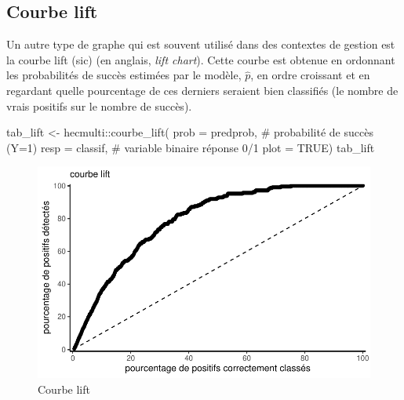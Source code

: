 \documentclass[
  11pt,
  letterpaper,
]{scrbook}
\newenvironment{Shaded}{\begin{snugshade}}{\end{snugshade}}
\newcommand{\AttributeTok}[1]{\textcolor[rgb]{0.40,0.45,0.13}{#1}}
\newcommand{\CommentTok}[1]{\textcolor[rgb]{0.37,0.37,0.37}{#1}}
\newcommand{\ConstantTok}[1]{\textcolor[rgb]{0.56,0.35,0.01}{#1}}
\newcommand{\FunctionTok}[1]{\textcolor[rgb]{0.28,0.35,0.67}{#1}}
\newcommand{\NormalTok}[1]{\textcolor[rgb]{0.00,0.23,0.31}{#1}}
\newcommand{\OtherTok}[1]{\textcolor[rgb]{0.00,0.23,0.31}{#1}}
\newcommand{\SpecialCharTok}[1]{\textcolor[rgb]{0.37,0.37,0.37}{#1}}
\theoremstyle{definition}
\theoremstyle{remark}
\begin{document}
\hypertarget{courbe-lift}{%
\subsection{Courbe lift}\label{courbe-lift}}

Un autre type de graphe qui est souvent utilisé dans des contextes de
gestion est la courbe lift (sic) (en anglais, \emph{lift chart}). Cette
courbe est obtenue en ordonnant les probabilités de succès estimées par
le modèle, \(\widehat{p}\), en ordre croissant et en regardant quelle
pourcentage de ces derniers seraient bien classifiés (le nombre de vrais
positifs sur le nombre de succès).

\begin{Shaded}
\begin{Highlighting}[]
\NormalTok{tab\_lift }\OtherTok{\textless{}{-}}\NormalTok{ hecmulti}\SpecialCharTok{::}\FunctionTok{courbe\_lift}\NormalTok{(}
  \AttributeTok{prob =}\NormalTok{ predprob, }\CommentTok{\# probabilité de succès (Y=1)}
  \AttributeTok{resp =}\NormalTok{ classif, }\CommentTok{\# variable binaire réponse 0/1}
  \AttributeTok{plot =} \ConstantTok{TRUE}\NormalTok{)}
\NormalTok{tab\_lift}
\end{Highlighting}
\end{Shaded}

\begin{figure}[ht!]

{\centering \includegraphics{reglogistique_files/figure-pdf/fig-lift-1.pdf}

}

\caption{\label{fig-lift}Courbe lift}

\end{figure}
\end{document}
